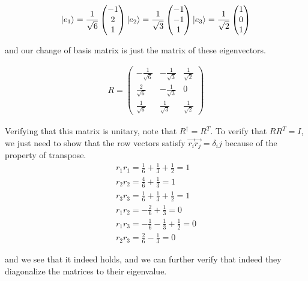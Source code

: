 \documentclass{article}
\begin{document}
\begin{align}
    \ket{e_1} = \frac{1}{\sqrt{6}} \begin{pmatrix}
        -1 \\ 2 \\ 1
    \end{pmatrix} 
    \ket{e_2} = \frac{1}{\sqrt{3}} \begin{pmatrix}
        -1 \\ -1 \\ 1
    \end{pmatrix}
    \ket{e_3} = \frac{1}{\sqrt{2}} \begin{pmatrix}
        1 \\ 0 \\ 1
    \end{pmatrix}
\end{align}

and our change of basis matrix is just the matrix of these eigenvectors.

\begin{align}
    R = \begin{pmatrix}
        -\frac{1}{\sqrt{6}} & -\frac{1}{\sqrt{3}} & \frac{1}{\sqrt{2}} \\
        \frac{2}{\sqrt{6}} & -\frac{1}{\sqrt{3}} & 0 \\
        \frac{1}{\sqrt{6}} & \frac{1}{\sqrt{3}} & \frac{1}{\sqrt{2}}
    \end{pmatrix}
\end{align}

Verifying that this matrix is unitary, note that $R^\dagger = R^T$. To verify that $RR^T = I$, we just need to show that the row vectors satisfy $\Vec{r_i}\Vec{r_j} = \delta_ij$ because of the property of transpose.
\begin{align}
    r_1 r_1 = \frac{1}{6} + \frac{1}{3} + \frac{1}{2} = 1\\
    r_2 r_2 = \frac{4}{6} + \frac{1}{3} = 1 \\
    r_3 r_3 = \frac{1}{6}+ \frac{1}{3} + \frac{1}{2} = 1 \\
    r_1 r_2 = -\frac{2}{6} + \frac{1}{3} = 0 \\
    r_1 r_3 = -\frac{1}{6} - \frac{1}{3} + \frac{1}{2} = 0\\
    r_2 r_3 = \frac{2}{6} - \frac{1}{3} = 0
\end{align}

and we see that it indeed holds, and we can further verify that indeed they diagonalize the matrices to their eigenvalue.
\end{document}
